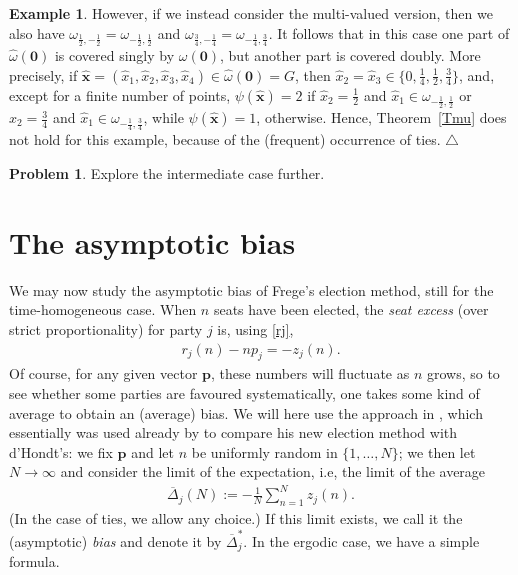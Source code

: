 \documentclass[11pt,reqno,tbtags,a4paper]{amsart}
\numberwithin{equation}{section}
\theoremstyle{plain}%
\theoremstyle{definition}
\newcommand\xqed[1]{%
    \leavevmode\unskip\penalty9999 \hbox{}\nobreak\hfill
    \quad\hbox{#1}}
\newtheorem{exampleqqq}[theorem]{Example}
\newenvironment{example}{\begin{exampleqqq}}
  {\xqed{$\triangle$}\end{exampleqqq}}
\newtheorem{problem}[theorem]{Problem}
\theoremstyle{remark}
\newcommand{\refT}[1]{Theorem~\ref{#1}}
\newcommand\set[1]{\ensuremath{\{#1\}}}
\newcommand\punkt{\xperiod}    %
\newcommand\ie{i.e\punkt}
\newcounter{cc}
\newcommand\gD{\Delta}
\newcommand\cL{{\omega}}
\newcommand\hcL{\hat{\cL}}
\newcommand\vp{\mathbf{p}}
\newcommand\hvx{\hat{\mathbf{x}}}
\newcommand\hx{\hat x}
\newcommand\bgD{\overline{\gD}}
\newcommand\bgDx{\overline{\gD}^*}
\newcommand\0{{\boldsymbol 0}}
\newcommand\1{{\boldsymbol 1}}
\begin{document}
\begin{example}
However, if we instead consider the multi-valued version, then we also have
$\cL_{\frac12,-\frac12}=\cL_{-\frac12,\frac12}$
and 
$\cL_{\frac34,-\frac14}=\cL_{-\frac14,\frac34}$.
%
It follows that 
in this case one part of $\hcL(\0)$ is covered singly
by $\cL(\0)$,
but another part is covered doubly. 
More precisely, if $\hvx=(\hx_1,\hx_2,\hx_3,\hx_4)\in\hcL(\0)=G$, 
then $\hx_2=\hx_3\in\set{0,\tfrac14,\frac12,\frac34}$,
and, except for a finite number of points,
$\psi(\hvx)=2$ 
if $\hx_2=\frac12$ and $\hx_1\in\cL_{-\frac12,\frac12}$
or $\hx_2=\frac34$ and $\hx_1\in\cL_{-\frac14,\frac34}$,
while
$\psi(\hvx)=1$,
otherwise.
Hence, \refT{Tmu} does not hold for this example,
because of the (frequent) occurrence of ties.
\end{example}


\begin{problem}
  Explore the intermediate case further.
\end{problem}



\section{The asymptotic bias}\label{Sbias}

We may now study the asymptotic bias of Frege's election method,
still for the time-homogeneous case.
When $n$ seats have been elected, the \emph{seat excess} 
(over strict proportionality)
for party $j$ is, using \eqref{rj},  
\begin{align}
  r_j(n)-np_j = -z_j(n).
\end{align}
Of course, for any given vector $\vp$, these numbers will fluctuate as $n$
grows, so to see whether some parties are favoured systematically,
one takes some kind of average to obtain an (average) bias.
We will here use the approach in  \cite{SJ262},
which essentially was used already by \citet{StL2} to compare
his new election method with d'Hondt's:
we fix $\vp$ and let $n$ be uniformly random in \set{1,\dots,N};
we then let $N\to\infty$ 
and consider the limit
of the expectation, \ie, the limit of the average
\begin{align}\label{bias}
\bgD_j(N):= - \frac{1}N\sum_{n=1}^Nz_j(n).
\end{align}
(In the case of ties, we allow any choice.)
If this limit exists,
we call it the (asymptotic) \emph{bias} and
denote it by $\bgDx_j$.
In the ergodic case, we have a simple formula.
\end{document}
